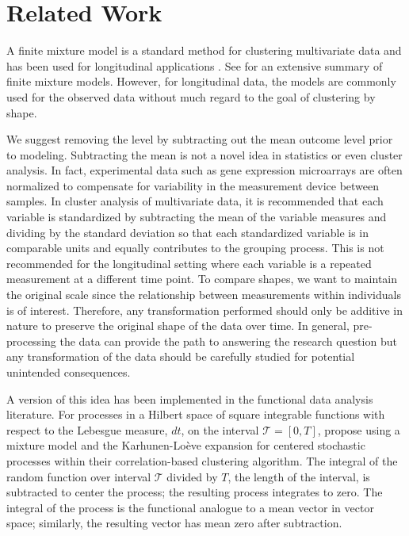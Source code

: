 \documentclass[12pt]{article}
\begin{document}
\section{Related Work}
A finite mixture model is a standard method for clustering multivariate data \cite{everitt2009} and has been used for longitudinal applications \cite{muthen2010, jones2001}. See \cite{mclachlan2000} for an extensive summary of finite mixture models. However, for longitudinal data, the models are commonly used for the observed data without much regard to the goal of clustering by shape. 

We suggest removing the level by subtracting out the mean outcome level prior to modeling. Subtracting the mean is not a novel idea in statistics or even cluster analysis. In fact, experimental data such as gene expression microarrays are often normalized to compensate for variability in the measurement device between samples. In cluster analysis of multivariate data, it is recommended that each variable is standardized by subtracting the mean of the variable measures and dividing by the standard deviation so that each standardized variable is in comparable units and equally contributes to the grouping process. This is not recommended for the longitudinal setting where each variable is a repeated measurement at a different time point. To compare shapes, we want to maintain the original scale since the relationship between measurements within individuals is of interest. Therefore, any transformation performed should only be additive in nature to preserve the original shape of the data over time. In general, pre-processing the data can provide the path to answering the research question but any transformation of the data should be carefully studied for potential unintended consequences.

A version of this idea has been implemented in the functional data analysis literature. For processes in a Hilbert space of square integrable functions with respect to the Lebesgue measure, $dt$, on the interval $\mathcal{T}=[0,T]$, \citet{chiou2008} propose using a mixture model and the Karhunen-Lo{\`e}ve expansion for centered stochastic processes within their correlation-based clustering algorithm. The integral of the random function over interval $\mathcal{T}$ divided by $T$, the length of the interval, is subtracted to center the process; the resulting process integrates to zero. The integral of the process is the functional analogue to a mean vector in vector space; similarly, the resulting vector has mean zero after subtraction.
\end{document}
